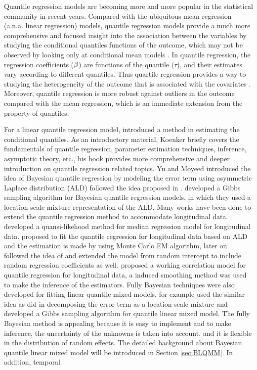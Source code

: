 \documentclass[12pt]{article}
\begin{document}
Quantile regression models are becoming more and more popular in the statistical community in recent years. Compared with the ubiquitous mean regression (a.n.a. linear regression) models, quantile regression models provide a much more comprehensive and focused insight into the association between the variables by studying the conditional quantiles functions of the outcome,  which may not be observed by looking only at conditional mean models \cite{koenker2005quantile}. In quantile regression, the regression coefficients (${\bf \beta}$) are functions of the quantile ($\tau$), and their estimates vary according to different quantiles. Thus quartile regression provides a way to studying the heterogeneity of the outcome that is associated with the covariates \cite{koenker2005quantile}. Moreover, quantile regression is more robust against outliers in the outcome compared with the mean regression, which is an immediate extension from the property of quantiles. \par


For a linear quantile regression model, \cite{koenker1978regression} introduced a method in estimating the conditional quantiles. As an introductory material, Koenker \cite{koenker2001quantile} briefly covers the fundamentals of quantile regression, parameter estimation techniques, inference, asymptotic theory, etc., his book \cite{koenker2005quantile} provides more comprehensive and deeper introduction on quantile regression related topics.  Yu and Moyeed \cite{yu2001bayesian} introduced the idea of Bayesian quantile regression by modeling the error term using asymmetric Laplace distribution (ALD) followed the idea proposed in \cite{koenker1978regression}. \cite{kozumi2011gibbs} developed a Gibbs sampling algorithm for Bayesian quantile regression models, in which they used a location-scale mixture representation of the ALD. Many works have been done to extend the quantile regression method to accommodate longitudinal data. \cite{jung1996quasi} developed a quansi-likehood method for median regression model for longitudinal data. \cite{geraci2007quantile} proposed to fit the quantile regression for longitudinal data based on ALD and the estimation is made by using Monte Carlo EM algorithm, later on \cite{liu2009mixed} followed the idea of \cite{geraci2007quantile} and extended the model from random intercept to include random regression coefficients as well. \cite{fu2012quantile} proposed  a working correlation model for quantile regression for longitudinal data, a induced smoothing method was used to make the inference of the estimators. Fully Bayesian techniques were also developed for fitting linear quantile mixed models, for example \cite{luo2012bayesian} used the similar idea as \cite{kozumi2011gibbs} did in decomposing the error term as a location-scale mixture and developed a Gibbs sampling algorithm for quantile linear mixed model. The fully Bayesian method is appealing because it is easy to implement and to make inference, the uncertainty of the unknowns is taken into account, and it is flexible in the distribution of random effects. The detailed background about Bayesian quantile linear mixed model will be introduced in Section \ref{sec:BLQMM}. In addition, temporal\par
\end{document}
